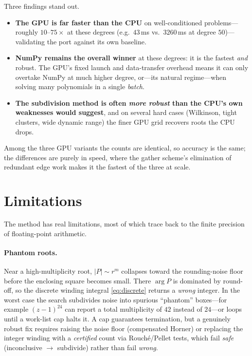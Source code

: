 \documentclass[11pt]{article}
\begin{document}
Three findings stand out.
\begin{itemize}
  \item \textbf{The GPU is far faster than the CPU} on well-conditioned
    problems---roughly $10$--$75\times$ at these degrees (e.g.\ $43$\,ms vs.\
    $3260$\,ms at degree $50$)---validating the port against its own baseline.
  \item \textbf{NumPy remains the overall winner} at these degrees: it is the
    fastest \emph{and} robust. The GPU's fixed launch and data-transfer overhead
    means it can only overtake NumPy at much higher degree, or---its natural
    regime---when solving many polynomials in a single \emph{batch}.
  \item \textbf{The subdivision method is often \emph{more robust} than the CPU's
    own weaknesses would suggest}, and on several hard cases (Wilkinson, tight
    clusters, wide dynamic range) the finer GPU grid recovers roots the CPU
    drops.
\end{itemize}
Among the three GPU variants the counts are identical, so accuracy is the same;
the differences are purely in speed, where the gather scheme's elimination of
redundant edge work makes it the fastest of the three at scale.

\section{Limitations}
\label{sec:limitations}
The method has real limitations, most of which trace back to the finite
precision of floating-point arithmetic.

\paragraph{Phantom roots.} Near a high-multiplicity root, $|P|\sim r^m$ collapses
toward the rounding-noise floor before the enclosing square becomes small. There
$\arg P$ is dominated by round-off, so the discrete winding integral
\eqref{eq:discrete} returns a \emph{wrong} integer. In the worst case the search
subdivides noise into spurious ``phantom'' boxes---for example $(z-1)^{24}$ can
report a total multiplicity of $42$ instead of $24$---or loops until a work-list
cap halts it. A cap guarantees termination, but a genuinely robust fix requires
raising the noise floor (compensated Horner) or replacing the integer winding
with a \emph{certified} count via Rouch\'e/Pellet tests, which fail \emph{safe}
(inconclusive $\to$ subdivide) rather than fail \emph{wrong}.
\end{document}
